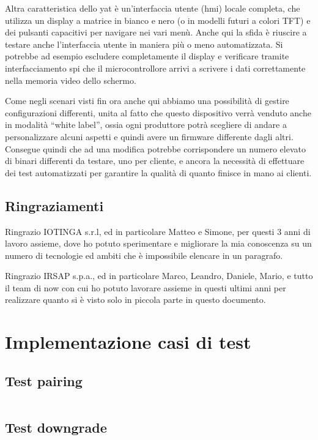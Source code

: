 \documentclass[12pt,a4paper,twoside,titlepage]{book}
\begin{document}
Altra caratteristica dello \acrshort{yat} è un'interfaccia utente (\acrshort{hmi})
locale completa, che utilizza un display a matrice in bianco e nero (o in modelli
futuri a colori TFT) e dei pulsanti capacitivi per navigare nei vari menù. Anche
qui la sfida è riuscire a testare anche l'interfaccia utente in maniera più o meno
automatizzata. Si potrebbe ad esempio escludere completamente il display e verificare
tramite interfacciamento \Gls{spi} che il microcontrollore arrivi a scrivere i dati correttamente
nella memoria video dello schermo.

Come negli scenari visti fin ora anche qui abbiamo una possibilità di gestire configurazioni
differenti, unita al fatto che questo dispositivo verrà venduto anche in modalità ``white label'',
ossia ogni produttore potrà scegliere di andare a personalizzare alcuni aspetti e quindi
avere un \gls{firmware} differente dagli altri. Consegue quindi che ad una modifica potrebbe
corrispondere un numero elevato di binari differenti da testare, uno per cliente, e
ancora la necessità di effettuare dei test automatizzati per garantire la qualità di
quanto finisce in mano ai clienti.

\section{Ringraziamenti}

Ringrazio IOTINGA s.r.l, ed in particolare Matteo e Simone, per questi 3 anni di
lavoro assieme, dove ho potuto sperimentare e migliorare la mia conoscenza su un
numero di tecnologie ed ambiti che è impossibile elencare in un paragrafo.

Ringrazio IRSAP s.p.a., ed in particolare Marco, Leandro, Daniele, Mario, e tutto il team
di \Gls{now} con cui ho potuto lavorare assieme in questi ultimi anni per realizzare
quanto si è visto solo in piccola parte in questo documento.

\appendix

\chapter{Implementazione casi di test}
\section{Test pairing}
\label{section:impl_test_pairing}
\inputminted[]{python3}{src/test_pairing.py}

\section{Test downgrade}
\label{section:impl_test_downgrade}
\inputminted[]{python3}{src/test_downgrade.py}
\end{document}
